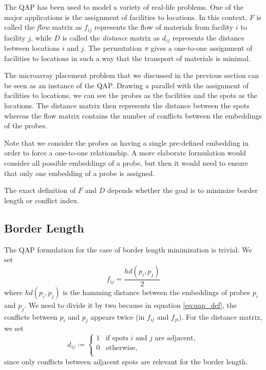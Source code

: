 \documentclass{bioinfo}
\begin{document}
The QAP has been used to model a variety of real-life problems. One of the major applications is the assignment of facilities to locations. In this context, $F$ is called the \emph{flow} matrix as $f_{ij}$ represents the flow of materials from facility $i$ to facility $j$, while $D$ is called the \emph{distance} matrix as $d_{ij}$ represents the distance between locations $i$ and $j$. The permutation $\pi$ gives a one-to-one assignment of facilities to locations in such a way that the transport of materials is minimal.

The microarray placement problem that we discussed in the previous section can be seen as an instance of the QAP. Drawing a parallel with the assignment of facilities to locations, we can see the probes as the facilities and the spots as the locations. The distance matrix then represents the distance between the spots whereas the flow matrix contains the number of conflicts between the embeddings of the probes.

Note that we consider the probes as having a single pre-defined embedding in order to force a one-to-one relationship. A more elaborate formulation would consider all possible embeddings of a probe, but then it would need to ensure that only one embedding of a probe is assigned.

The exact definition of $F$ and $D$ depends whether the goal is to minimize border length or conflict index.

\subsection{Border Length}

The QAP formulation for the case of border length minimization is trivial. We set
\begin{equation}
f_{ij} = \frac{hd(p_i, p_j)}{2}
\end{equation}
where $hd(p_i, p_j)$ is the hamming distance between the embeddings of probes $p_i$ and $p_j$. We need to divide it by two because in equation \ref{eq:qap_def}, the conflicts between $p_i$ and $p_j$ appears twice (in $f_{ij}$ and $f_{ji}$). For the distance matrix, we set
\begin{equation} d_{ij} :=
        \left\{
                \begin{array}{ll}
                        1 & \mbox{if spots $i$ and $j$ are adjacent}, \\
                        0 & \mbox{otherwise}, \\
                \end{array}
        \right.
\end{equation}
since only conflicts between adjacent spots are relevant for the border length.
\end{document}
